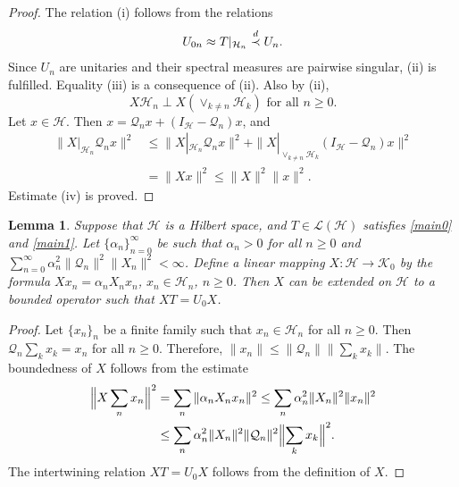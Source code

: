 \documentclass[a4paper,oneside,11pt]{amsart}
\numberwithin{equation}{section}
\theoremstyle{plain}
\newtheorem{lemma}[theorem]{Lemma}
\theoremstyle{definition}
\begin{document}
\begin{proof} The relation (i) follows from the relations 
$$ U_{0n}\approx T|_{\mathcal H_n} \buildrel d\over\prec  U_n.$$ 
Since $U_n$ are unitaries and their  spectral measures are pairwise singular,  (ii) is fulfilled. Equality (iii) is a consequence of (ii).  Also by (ii),  $$X\mathcal H_n\perp X(\vee_{k\neq n}\mathcal H_k) \text{ for all } n\geq 0.$$
Let $x\in\mathcal H$. Then $x=\mathcal Q_n x + (I_{\mathcal H}-\mathcal Q_n) x$, and
\begin{equation*}\begin{aligned}\|X|_{\mathcal H_n}\mathcal Q_n x\|^2&\leq \|X|_{\mathcal H_n}\mathcal Q_n x\|^2+
\|X|_{\vee_{k\neq n}\mathcal H_k }(I_{\mathcal H}-\mathcal Q_n) x\|^2 \\&
=\|Xx\|^2\leq\|X\|^2\|x\|^2. \end{aligned}\end{equation*}
Estimate (iv) is proved.
 \end{proof}

\begin{lemma}\label{lem2new} Suppose that $\mathcal H$ is a Hilbert space, and   
  $T\in  \mathcal L(\mathcal H)$ satisfies \eqref{main0} and \eqref{main1}. 
Let  $\{\alpha_n\}_{n=0}^\infty$ be such that $\alpha_n>0$ for all $n\geq 0$ and 
$\sum_{n=0}^\infty \alpha_n^2\|\mathcal Q_n\|^2\|X_n\|^2<\infty$. Define 
a  linear mapping  $X\colon\mathcal H\to \mathcal K_0$ by the formula $Xx_n=\alpha_n X_n x_n$, $x_n\in \mathcal H_n$, $n\geq 0$. 
Then $X$ can be  extended on $\mathcal H$ to a bounded operator such that $XT=U_0X$. 
\end{lemma}

\begin{proof}  
Let $\{x_n\}_n$ be a finite family such that $x_n\in\mathcal H_n$ for all $n\geq 0$. Then $\mathcal Q_n\sum_k x_k=x_n$ for all $n\geq 0$. 
Therefore, $\|x_n\|\leq\|\mathcal Q_n\|\|\sum_k x_k\|$. 
The boundedness of $X$ follows from the estimate
\begin{equation*}\begin{aligned} \Bigl \|X\sum_n x_n\Bigr \|^2&=\sum_n\| \alpha_n X_n x_n\|^2\leq \sum_n\alpha_n^2\| X_n\|^2\| x_n\|^2\\& \leq 
\sum_n\alpha_n^2\| X_n\|^2\|\mathcal Q_n\|^2\Bigl \|\sum_k x_k\Bigr \|^2. \end{aligned}\end{equation*}
The intertwining relation $XT=U_0X$ follows from the definition of $X$.
\end{proof}
\end{document}
